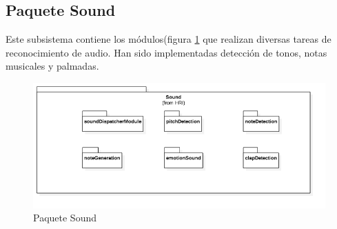 \subsection{Paquete Sound}
Este subsistema contiene los módulos(figura \ref{fig:sound-package} que realizan diversas tareas de reconocimiento de audio.  Han sido implementadas detección de tonos, notas musicales y palmadas.
\begin{figure}
	\centering
	\includegraphics[width=1\linewidth]{imagenes/diagramas/Sound.png}
	\caption{Paquete Sound}
	\label{fig:sound-package}
\end{figure}
